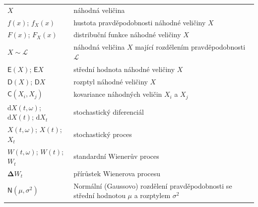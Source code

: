 \documentclass[a4paper,12pt]{report}
\theoremstyle{definition} \newtheorem{definice}[veta]{Definice}
\theoremstyle{remark}
\begin{document}
   \begin{tabular}{p{4cm} p{9.3cm}}
   $X$                                                &   náhodná veličina \\
   $f(x)$; $f_X(x)$                                               &   hustota pravděpodobnosti náhodné veličiny $X$ \\ %
   $F(x)$; $F_X(x)$				 &  distribuční funkce náhodné veličiny $X$ \\
   $X\sim \mathcal{L}$                                &   náhodná veličina $X$ mající rozdělením pravděpodobnosti $\mathcal{L}$ \\ %
   $\mathsf{E}(X)$;  $\mathsf{E}X$                         	      &   střední hodnota náhodné veličiny $X$ \\
   $\mathsf{D}(X)$;  $\mathsf{D}X$                       	      &   rozptyl náhodné veličiny $X$ \\
   $\mathsf{C}(X_i,X_j)$             		      &   kovariance náhodných veličin $X_i$ a $X_j$\\
   $\mathrm{d}X(t,\omega)$; $\mathrm{d}X(t)$; $\mathrm{d}X_t$    &  stochastický diferenciál \\ %
   $X(t,\omega)$; $X(t)$; $X_t$                       &   stochastický proces \\
   $W(t,\omega)$; $W(t)$; $W_t$                       &   standardní Wienerův proces \\
   $\boldsymbol{\Delta} W_t$			                      &   přírůstek Wienerova procesu \\
   $\mathsf{N}(\mu, \sigma^{2})$                      &   Normální (Gaussovo) rozdělení pravděpodobnosti se střední hodnotou $\mu$ a rozptylem $\sigma^2$  \\
   \end{tabular}\\\\\\
\end{document}
